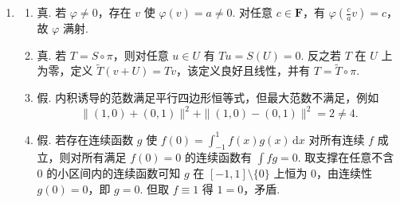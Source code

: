 \begin{enumerate}
\begin{enumerate}
        由内积的性质，对任意的 $n$，由于 $e_0,c_1,s_1,\ldots,c_n,s_n$ 为规范正交组，故
        \[
            \langle f,e_0\rangle^2+\sum_{k=1}^n(\langle f,c_k\rangle^2+\langle f,s_k\rangle^2)
            \leqslant \|f\|^2 = \langle f,f\rangle.
        \]
        代入之前计算的系数，并令 $n\to\infty$ 得
        \[
            \frac{a_0^2}{2}+\sum_{k=1}^{\infty}(a_k^2+b_k^2)
            \leqslant \int_{-\pi}^{\pi}f^2(x)\,\mathrm{d}x.
        \]
    \end{enumerate}

    \item
    \begin{enumerate}
        \item 真. 若 $\varphi\neq 0$，存在 $v$ 使 $\varphi(v)=a\neq 0$. 对任意 $c\in\mathbf{F}$，有 $\varphi(\frac ca v)=c$，故 $\varphi$ 满射.

        \item 真. 若 $T=S\circ\pi$，则对任意 $u\in U$ 有 $Tu=S(U)=0$. 反之若 $T$ 在 $U$ 上为零，定义 $\widetilde{T}(v+U)=Tv$，该定义良好且线性，并有 $T=\widetilde{T}\circ\pi$.

        \item 假. 内积诱导的范数满足平行四边形恒等式，但最大范数不满足，例如
        \[
            \|(1,0)+(0,1)\|^2+\|(1,0)-(0,1)\|^2=2\neq 4.
        \]

        \item 假. 若存在连续函数 $g$ 使 $f(0)=\int_{-1}^1 f(x)g(x)\,\mathrm{d}x$ 对所有连续 $f$ 成立，则对所有满足 $f(0)=0$ 的连续函数有 $\int fg=0$. 取支撑在任意不含 $0$ 的小区间内的连续函数可知 $g$ 在 $[-1,1]\setminus\{0\}$ 上恒为 $0$，由连续性 $g(0)=0$，即 $g=0$. 但取 $f\equiv 1$ 得 $1=0$，矛盾.
    \end{enumerate}
\end{enumerate}

\clearpage
